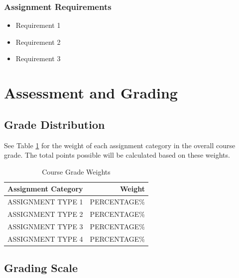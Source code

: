 \documentclass[12pt]{article}
\begin{document}
\subsubsection*{Assignment Requirements}
\begin{itemize}
\item Requirement 1
\item Requirement 2
\item Requirement 3
\end{itemize}

\section*{Assessment and Grading}

\subsection*{Grade Distribution}

See Table \ref{tab:grade-weights} for the weight of each assignment category in the overall course grade. The total points possible will be calculated based on these weights.

\begin{table}[ht]
\caption{Course Grade Weights}
\centering
\begin{tabular}{>{\raggedright}p{}r}
\toprule
\textbf{Assignment Category} & \textbf{Weight} \\
\midrule
ASSIGNMENT TYPE 1 & PERCENTAGE\% \\
ASSIGNMENT TYPE 2 & PERCENTAGE\% \\
ASSIGNMENT TYPE 3 & PERCENTAGE\% \\
ASSIGNMENT TYPE 4 & PERCENTAGE\% \\
\bottomrule
\end{tabular}
\label{tab:grade-weights}
\end{table}

\subsection*{Grading Scale}
\end{document}
